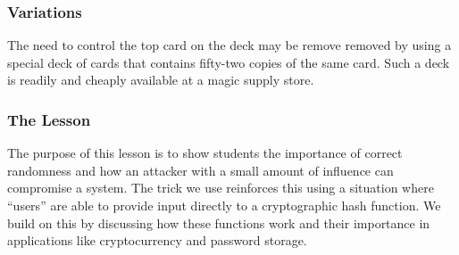 \subsubsection{Variations}

The need to control the top card on the deck may be remove removed by using a
special deck of cards that contains fifty-two copies of the same card.  Such a
deck is readily and cheaply available at a magic supply store.

\subsubsection{The Lesson}

The purpose of this lesson is to show students the importance of correct
randomness and how an attacker with a small amount of influence can compromise a
system.
The trick we use reinforces this using
a situation where ``users'' are able to provide input
directly to a cryptographic hash function.
We build on this by discussing how these functions work and their importance
in applications like cryptocurrency and password storage.
